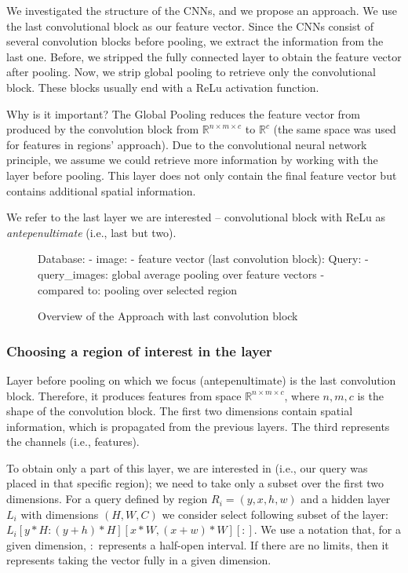 We investigated the structure of the CNNs, and we propose an approach. We use the last convolutional block as our feature vector. Since the CNNs consist of several convolution blocks before pooling, we extract the information from the last one. Before, we stripped the fully connected layer to obtain the feature vector after pooling. Now, we strip global pooling to retrieve only the convolutional block. These blocks usually end with a ReLu activation function.

Why is it important? The Global Pooling reduces the feature vector from produced by the convolution block from  $\mathbb{R}^{n\times m \times c}$ to  $\mathbb{R}^{c}$ (the same space was used for features in regions' approach). Due to the convolutional neural network principle, we assume we could retrieve more information by working with the layer before pooling. This layer does not only contain the final feature vector but contains additional spatial information.

We refer to the last layer we are interested -- convolutional block with ReLu as \emph{antepenultimate} (i.e., last but two). 

\begin{figure}
\centering
\begin{boxedverbatim}
Database:
    - image:
        - feature vector (last convolution block):
Query:
    - query_images: global average pooling over feature vectors
    - compared to: pooling over selected region
\end{boxedverbatim}
\caption{Overview of the Approach with last convolution block}
\end{figure}


\subsubsection{Choosing a region of interest in the layer}

Layer before pooling on which we focus (antepenultimate) is the last convolution block. Therefore, it produces features from space $\mathbb{R}^{n\times m \times c}$, where $n, m, c$ is the shape of the convolution block. The first two dimensions contain spatial information, which is propagated from the previous layers. The third represents the channels (i.e., features).

To obtain only a part of this layer, we are interested in (i.e., our query was placed in that specific region); we need to take only a subset over the first two dimensions. For a query defined by region $R_i = (y, x, h, w)$ and a hidden layer $L_i$ with dimensions $(H, W, C)$ we consider select following subset of the layer: $L_i[y * H: (y+h) * H][x*W, (x + w) * W][:]$. We use a notation that, for a given dimension, $:$ represents a half-open interval. If there are no limits, then it represents taking the vector fully in a given dimension.

